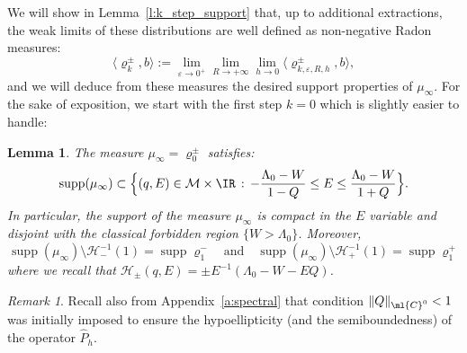 \documentclass[10pt]{amsart}
\theoremstyle{plain}
\newtheorem{lemm}[theo]{Lemma}
\theoremstyle{definition}
\theoremstyle{remark}
\newtheorem{rema}[theo]{Remark}
\begin{document}
We will show in Lemma~\ref{l:k_step_support} that, up to additional extractions, the weak limits of these distributions are well defined as non-negative Radon measures:
\[
\langle \varrho_{k}^\pm , b \rangle := \lim_{\varepsilon\to 0^+}\lim_{R \to + \infty} \lim_{h \to 0} \langle \varrho^\pm_{k,\varepsilon,R,h} , b \rangle,
\]
and we will deduce from these measures the desired support properties of $\mu_\infty$. For the sake of exposition, we start with the first step $k = 0$ which is slightly easier to handle:

\begin{lemm}
\label{l:0_step_support} The measure $\mu_\infty= \varrho_{0}^{\pm}$ satisfies:
\[
\operatorname{supp}(\mu_\infty)\subset\Bigl\{ (q,E) \in \mathcal{M} \times \IR \, : \, -\frac{\Lambda_0-W}{1-Q}\leq E \leq \frac{\Lambda_0-W}{1+Q}\Bigr\}.
\]
In particular, the support of the measure $\mu_\infty$ is compact in the $E$ variable and disjoint with the classical forbidden region $\{W>\Lambda_0\}$. Moreover,
\begin{equation}
\operatorname{supp}(\mu_\infty) \setminus \mathcal{H}_-^{-1}(1) = \operatorname{supp} \varrho^-_{1} \quad \text{and}\quad \operatorname{supp}(\mu_\infty) \setminus \mathcal{H}_+^{-1}(1) = \operatorname{supp} \varrho^+_{1}
\end{equation}
where we recall that $\mathcal{H}_{\pm}(q,E) = \pm E^{-1}(\Lambda_0 - W - E Q)$.
\end{lemm}

\begin{rema}
Recall also from Appendix~\ref{a:spectral} that condition $\|Q\|_{\ml{C}^0}<1$ was initially imposed to ensure the hypoellipticity (and the semiboundedness) of the operator $\widehat{P}_h$.
\end{rema}
\end{document}
